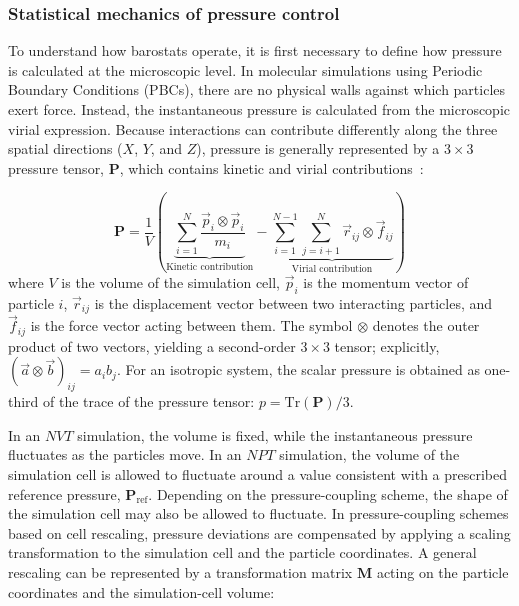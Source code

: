 \subsubsection{Statistical mechanics of pressure control}

To understand how barostats operate, it is first necessary to define how pressure is calculated at the microscopic level. In molecular simulations using Periodic Boundary Conditions (PBCs), there are no physical walls against which particles exert force. Instead, the instantaneous pressure is calculated from the microscopic virial expression. Because interactions can contribute differently along the three spatial directions ($X$, $Y$, and $Z$), pressure is generally represented by a $3\times3$ pressure tensor, $\mathbf{P}$, which contains kinetic and virial contributions~\cite{termo_metad_presion}:

\begin{equation}\label{eq:virial_tensor}
    \mathbf{P} = \frac{1}{V} \left( \underbrace{\sum_{i=1}^{N} \frac{\vec{p}_i \otimes \vec{p}_i}{m_i}}_{\text{Kinetic contribution}} - \underbrace{\sum_{i=1}^{N-1} \sum_{j=i+1}^{N} \vec{r}_{ij} \otimes \vec{f}_{ij}}_{\text{Virial contribution}} \right)
\end{equation}
where $V$ is the volume of the simulation cell, $\vec{p}_i$ is the momentum vector of particle $i$, $\vec{r}_{ij}$ is the displacement vector between two interacting particles, and $\vec{f}_{ij}$ is the force vector acting between them. The symbol $\otimes$ denotes the 
outer product of two vectors, yielding a second-order $3 \times 3$ tensor; explicitly, $(\vec{a} \otimes \vec{b})_{ij} = a_i b_j$. For an isotropic system, the scalar pressure is obtained as one-third of the trace of the pressure tensor: $p = \text{Tr}(\mathbf{P})/3$.

In an $NVT$ simulation, the volume is fixed, while the instantaneous pressure fluctuates as the particles move. In an $NPT$ simulation, the volume of the simulation cell is allowed to fluctuate around a value consistent with a prescribed reference pressure, $\mathbf{P}_{\mathrm{ref}}$. Depending on the pressure-coupling scheme, the shape of the simulation cell may also be allowed to fluctuate. In pressure-coupling schemes based on cell rescaling, pressure deviations are compensated by applying a scaling transformation to the simulation cell and the particle coordinates. A general rescaling can be represented by a transformation matrix $\mathbf{M}$ acting on the particle coordinates and the simulation-cell volume:

